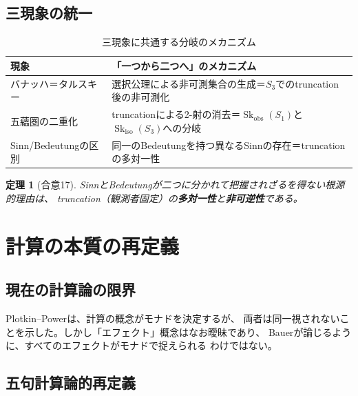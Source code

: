 \documentclass[11pt,a4paper]{ltjsarticle}
\newtheorem{theorem}[definition]{定理}
\theoremstyle{remark}
\newcommand{\Skobs}{\mathop{\mathrm{Sk}}_{\mathrm{obs}}}
\newcommand{\Skiso}{\mathop{\mathrm{Sk}}_{\mathrm{iso}}}
\begin{document}
\subsection{三現象の統一}

\begin{table}[htbp]
\centering
\caption{三現象に共通する分岐のメカニズム}
\label{tab:three-phenomena}
\small
\begin{tabularx}{\textwidth}{@{}>{\raggedright\arraybackslash}X >{\raggedright\arraybackslash}X@{}}
\toprule
現象 & 「一つから二つへ」のメカニズム \\
\midrule
バナッハ＝タルスキー & 選択公理による非可測集合の生成＝$S_3$でのtruncation後の非可測化 \\
五蘊圏の二重化 & truncationによる2-射の消去＝$\Skobs(S_1)$と$\Skiso(S_3)$への分岐 \\
Sinn/Bedeutungの区別 & 同一のBedeutungを持つ異なるSinnの存在＝truncationの多対一性 \\
\bottomrule
\end{tabularx}
\end{table}

\begin{theorem}[合意17]
SinnとBedeutungが二つに分かれて把握されざるを得ない根源的理由は、
truncation（観測者固定）の\textbf{多対一性}と\textbf{非可逆性}である。
\end{theorem}

\section{計算の本質の再定義}
\label{sec:computation}

\subsection{現在の計算論の限界}

Plotkin--Power\cite{PlotkinPower2002}は、計算の概念がモナドを決定するが、
両者は同一視されないことを示した。しかし「エフェクト」概念はなお曖昧であり、
Bauer\cite{Bauer2008}が論じるように、すべてのエフェクトがモナドで捉えられる
わけではない。

\subsection{五句計算論的再定義}
\end{document}
